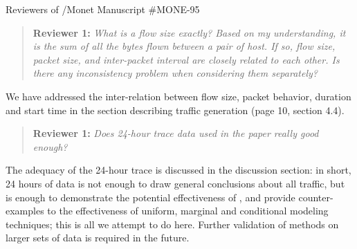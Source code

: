 \documentclass{letter}
\newenvironment{reviewer}[1]%
{\begin{quote}\textbf{Reviewer #1:} \it}{\end{quote}}
\begin{document}
\begin{letter}{Reviewers of /Monet Manuscript \#MONE-95}

\begin{reviewer}{1}
What is a flow size exactly? Based on my understanding, it is the sum of all the bytes ﬂown between a pair of host. If so, flow size, packet size, and inter-packet interval are closely related to each other. Is there any inconsistency problem when considering them separately?
\end{reviewer}
We have addressed the inter-relation between flow size, packet behavior, duration and start time in the section describing traffic generation (page 10, section 4.4).

\begin{reviewer}{1}
Does 24-hour trace data used in the paper really good enough?
\end{reviewer}
The adequacy of the 24-hour trace is discussed in the discussion section: in short, 24 hours of data is not enough to draw general conclusions about all traffic, but is enough to demonstrate the potential effectiveness of , and provide counter-examples to the effectiveness of uniform, marginal and conditional modeling techniques;
this is all we attempt to do here.
Further validation of methods on larger sets of data is required in the future.


\end{letter}
\end{document}
